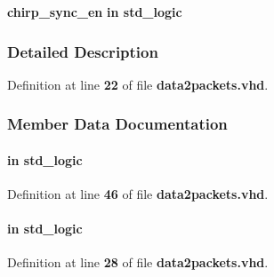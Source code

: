 \begin{DoxyCompactItemize}
\item 
{\bf chirp\+\_\+sync\+\_\+en}  {\bfseries {\bfseries \textcolor{keywordflow}{in}\textcolor{vhdlchar}{ }}} {\bfseries \textcolor{comment}{std\+\_\+logic}\textcolor{vhdlchar}{ }} 
\end{DoxyCompactItemize}


\subsubsection{Detailed Description}


Definition at line {\bf 22} of file {\bf data2packets.\+vhd}.



\subsubsection{Member Data Documentation}
\paragraph[{chirp\+\_\+sync\+\_\+en}]{ {\bfseries \textcolor{keywordflow}{in}\textcolor{vhdlchar}{ }} {\bfseries \textcolor{comment}{std\+\_\+logic}\textcolor{vhdlchar}{ }} \hspace{0.3cm}{\ttfamily [Port]}}\label{classdata2packets_a2eb0dd53d4912cecebab02d114ed6707}


Definition at line {\bf 46} of file {\bf data2packets.\+vhd}.

\paragraph[{clk}]{ {\bfseries \textcolor{keywordflow}{in}\textcolor{vhdlchar}{ }} {\bfseries \textcolor{comment}{std\+\_\+logic}\textcolor{vhdlchar}{ }} \hspace{0.3cm}{\ttfamily [Port]}}\label{classdata2packets_a4a4609c199d30b3adebbeb3a01276ec5}


Definition at line {\bf 28} of file {\bf data2packets.\+vhd}.

\paragraph[{ieee}]{\hspace{0.3cm}{\ttfamily [Library]}}\label{classdata2packets_a0a6af6eef40212dbaf130d57ce711256}



